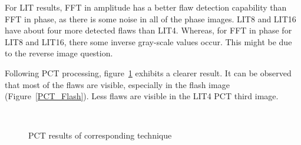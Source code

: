 For LIT results, FFT in amplitude has a better flaw detection capability than FFT in phase, as there is some noise in all of the phase images. LIT8 and LIT16 have about four more detected flaws than LIT4. Whereas, for FFT in phase for LIT8 and LIT16, there some inverse gray-scale values occur. This might be due to the reverse image question.

Following PCT processing, figure~\ref{PCT_results} exhibits a clearer result. It can be observed that most of the flaws are visible, especially in the flash image (Figure~\ref{PCT_Flash}). Less flaws are visible in the LIT4 PCT third image.

\begin{figure}[htpb]
    \centering
    \hspace{10pt}
    \hspace{10pt}
    \\ %
    \hspace{10pt}
    \caption{PCT results of corresponding technique}
    \label{PCT_results}
\end{figure}


